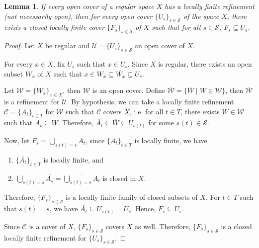\documentclass[12pt,oneside,english]{amsbook}
\numberwithin{equation}{section} %
\numberwithin{figure}{section} %
\theoremstyle{plain}
\numberwithin{section}{chapter}
\theoremstyle{plain}
\newtheorem{lem}[thm]{Lemma}
\begin{document}
\begin{lem} \label{lem:paracompact:3}
  If every open cover of a regular space $X$ has a locally finite refinement (not necessarily open), then for every open cover $\{U_{s}\}_{s \in \mathcal{S}}$ of the space $X$, there exists a closed locally finite cover $\{F_{s}\}_{s \in \mathcal{S}}$ of $X$ such that for all $s \in \mathcal{S}$, $F_{s} \subseteq U_{s}$. 
\end{lem}
\begin{proof}
  Let $X$ be regular and $\mathcal{U} = \{U_{s}\}_{s \in \mathcal{S}}$ an open cover of $X$.

  For every $x \in X$, fix $U_s$ such that $x \in U_s$. Since $X$ is regular, there exists an open subset $W_x$ of $X$ such that $x \in W_x \subseteq \overline{W_x} \subseteq U_{s}$.

  Let $\mathcal{W} = \{W_x\}_{x \in X}$, then $\mathcal{W}$ is an open cover. Define $\overline{\mathcal{W}} = \{\overline{W} \; | \; W \in \mathcal{W} \}$, then $\overline{\mathcal{W}}$ is a refinement for $\mathcal{U}$. By hypothesis, we can take a locally finite refinement $\mathcal{C} = \{A_{t}\}_{t \in T}$ for $\mathcal{W}$ such that $\mathcal{C}$ covers $X$, i.e. for all $t \in T$, there exists $W \in \mathcal{W}$ such that $A_{t} \subseteq W$. Therefore, $\overline{A_{t}} \subseteq \overline{W} \subseteq U_{s(t)}$ for some $s(t) \in \mathcal{S}$.

  Now, let $F_{s} = \bigcup_{s(t) = s} \overline{A_{t}}$, since $\{A_{t}\}_{t \in T}$ is locally finite, we have
  \begin{enumerate}
  \item $\{\overline{A_{t}}\}_{t \in T}$ is locally finite, and
  \item $\bigcup_{s(t) = s}\overline{A_{s}} = \overline{\bigcup_{s(t) = s}A_{t}}$ is closed in $X$.
  \end{enumerate}

  Therefore, $\{F_{s}\}_{s \in \mathcal{S}}$ is a locally finite family of closed subsets of $X$. For $t \in T$ such that $s(t) = s$, we have $\overline{A_{t}} \subseteq U_{s(t)} = U_{s}$. Hence, $F_{s} \subseteq U_{s}$.

  Since $\mathcal{C}$ is a cover of $X$, $\{F_{s}\}_{s \in \mathcal{S}}$ covers $X$ as well. Therefore, $\{F_{s}\}_{s \in \mathcal{S}}$ is a closed locally finite refinement for $\{U_{s}\}_{s \in \mathcal{S}}$.
\end{proof}
\end{document}
